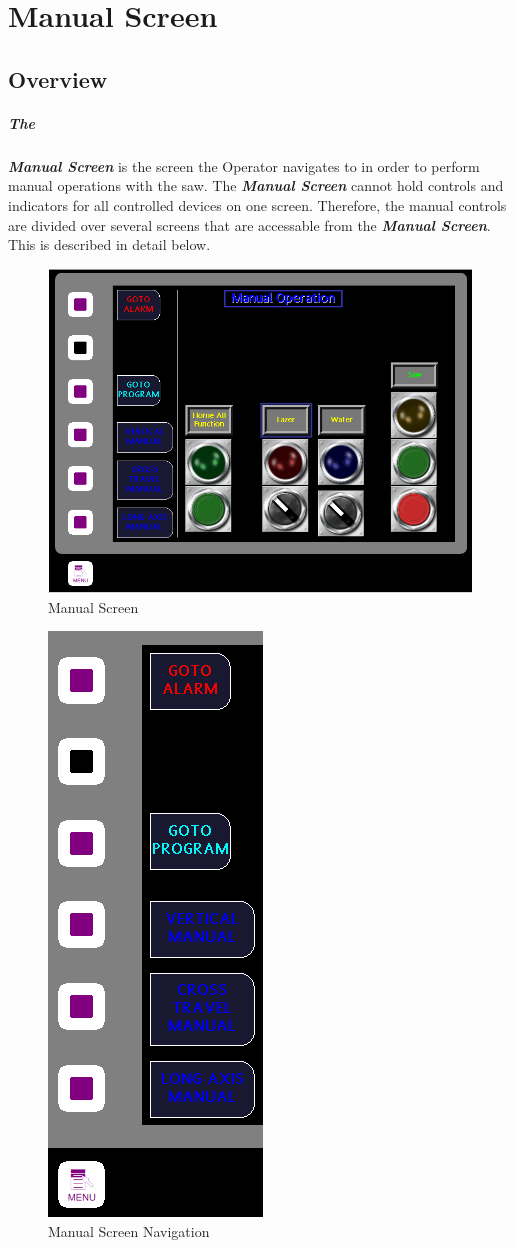 \chapter{Manual Screen}
\section{Overview} \paragraph*{The}\textbf{\textit{Manual Screen}} is the screen the Operator navigates to in order to perform manual operations with the saw. The \textbf{\textit{Manual Screen}} cannot hold controls and indicators for all controlled devices on one screen. Therefore, the manual controls are divided over several screens that are accessable from the \textbf{\textit{Manual Screen}}. This is described in detail below.
\begin{figure}
	\centering
	\includegraphics[width=0.5
	\linewidth]{screen-captures/manual/manual}
	\caption{Manual Screen}
	\label{fig:manual-screen}
\end{figure}
\pagebreak
\begin{figure}
	\centering
	\includegraphics[width=.3\linewidth]{screen-captures/manual/manual-nav}
	\caption{Manual Screen Navigation}
	\label{fig:manual-nav}
\end{figure}
